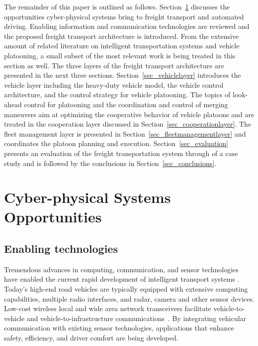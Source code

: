 \documentclass[journal]{IEEEtran}
\begin{document}
The remainder of this paper is outlined as follows. Section~\ref{sec_opportunities} discusses the opportunities cyber-physical systems bring to freight transport and automated driving. Enabling information and communication technologies are reviewed and the proposed freight transport architecture is introduced. From the extensive amount of related literature on intelligent transportation systems and vehicle platooning, a small subset of the most relevant work is being treated in this section as well. The three layers of the freight transport architecture are presented in the next three sections. Section~\ref{sec_vehiclelayer} introduces the vehicle layer including the heavy-duty vehicle model, the vehicle control architecture, and the control strategy for vehicle platooning. The topics of look-ahead control for platooning and the coordination and control of merging maneuvers aim at optimizing the cooperative behavior of vehicle platoons and are treated in the cooperation layer discussed in Section~\ref{sec_cooperationlayer}. The fleet management layer is presented in Section~\ref{sec_fleetmanagementlayer} and coordinates the platoon planning and execution. Section~\ref{sec_evaluation} presents an evaluation of the freight transportation system through of a case study and is followed by the conclusions in Section~\ref{sec_conclusions}.




\section{Cyber-physical Systems Opportunities}\label{sec_opportunities}


\subsection{Enabling technologies}\label{sec_enablingtech}
Tremendous advances in computing, communication, and sensor technologies have enabled the current rapid development of intelligent transport systems \cite{gharavi_2007}. Today's high-end road vehicles are typically equipped with extensive computing capabilities, multiple radio interfaces, and radar, camera and other sensor devices. Low-cost wireless local and wide area network transceivers facilitate vehicle-to-vehicle and vehicle-to-infrastructure communications~\cite{hartenstein_2008,karagiannis_2011}. By integrating vehicular communication with existing sensor technologies, applications that enhance safety, efficiency, and driver comfort are being developed.
\end{document}
